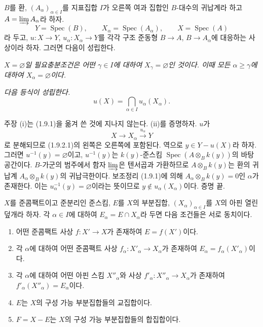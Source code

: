 \begin{proposition}[1.9.2]
\label{IV.1.9.2-fr}
$B$를 환, $(A_\alpha)_{\alpha\in I}$를 지표집합 $I$가 오른쪽 여과
집합인 $B$-대수의 귀납계라 하고 $A=\varinjlim A_\alpha$라 하자.
\[
  Y=\operatorname{Spec}(B),\qquad
  X_\alpha=\operatorname{Spec}(A_\alpha),\qquad
  X=\operatorname{Spec}(A)
\]
라 두고, $u:X\to Y$, $u_\alpha:X_\alpha\to Y$를 각각 구조 준동형
$B\to A$, $B\to A_\alpha$에 대응하는 사상이라 하자. 그러면 다음이
성립한다.
\end{proposition}

\begin{env}[1.9.2.i]
\label{IV.1.9.2.i-fr}
\emph{$X=\varnothing$일 필요충분조건은 어떤 $\gamma\in I$에 대하여
$X_\gamma=\varnothing$인 것이다. 이때 모든 $\alpha\geq\gamma$에
대하여 $X_\alpha=\varnothing$이다.}
\end{env}


\begin{env}[1.9.2.ii]
\label{IV.1.9.2.ii-fr}
\emph{다음 등식이 성립한다.}
\[
  u(X)=\bigcap_{\alpha\in I}u_\alpha(X_\alpha). \tag{1.9.2.1}
  \label{IV.1.9.2.1-fr}
\]
\end{env}

주장 (i)는 (1.9.1)을 옮겨 쓴 것에 지나지 않는다. (ii)를 증명하자.
$u$가
\[
  X\longrightarrow X_\alpha\xrightarrow{u_\alpha}Y
\]
로 분해되므로 (1.9.2.1)의 왼쪽은 오른쪽에 포함된다. 역으로
$y\in Y-u(X)$라 하자. 그러면 $u^{-1}(y)=\varnothing$이고,
$u^{-1}(y)$는 $k(y)$-준스킴
$\operatorname{Spec}(A\otimes_Bk(y))$의 바탕공간이다. $B$-가군의
범주에서 함자 $\varinjlim$은 텐서곱과 가환하므로
$A\otimes_Bk(y)$는 환의 귀납계
$A_\alpha\otimes_Bk(y)$의 귀납극한이다. 보조정리 (1.9.1)에 의해
$A_\alpha\otimes_Bk(y)=0$인 $\alpha$가 존재한다. 이는
$u_\alpha^{-1}(y)=\varnothing$이라는 뜻이므로
$y\notin u_\alpha(X_\alpha)$이다. 증명 끝.

\begin{proposition}[1.9.3]
\label{IV.1.9.3-fr}
$X$를 준콤팩트이고 준분리인 준스킴, $E$를 $X$의 부분집합,
$(X_\alpha)_{\alpha\in I}$를 $X$의 아핀 열린덮개라 하자. 각
$\alpha\in I$에 대하여 $E_\alpha=E\cap X_\alpha$라 두면 다음 조건들은
서로 동치이다.
\begin{enumerate}
  \item[a)] 어떤 준콤팩트 사상 $f:X'\to X$가 존재하여
  $E=f(X')$이다.
  \item[a$'$)] 각 $\alpha$에 대하여 어떤 준콤팩트 사상
  $f_\alpha:X'_\alpha\to X_\alpha$가 존재하여
  $E_\alpha=f_\alpha(X'_\alpha)$이다.
  \item[a$''$)] 각 $\alpha$에 대하여 어떤 아핀 스킴 $X''_\alpha$와
  사상 $f'_\alpha:X''_\alpha\to X_\alpha$가 존재하여
  $f'_\alpha(X''_\alpha)=E_\alpha$이다.
  \item[b)] $E$는 $X$의 구성 가능 부분집합들의 교집합이다.
  \item[b$'$)] $F=X-E$는 $X$의 구성 가능 부분집합들의 합집합이다.
\end{enumerate}
\end{proposition}

